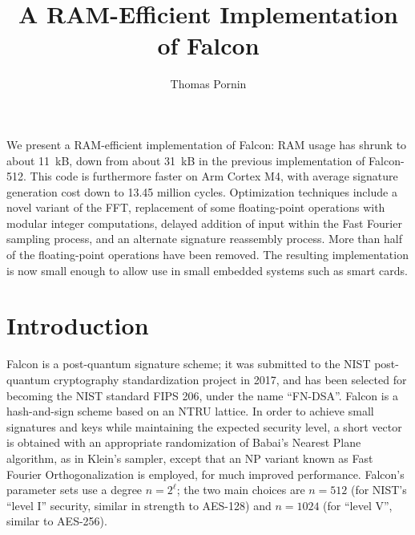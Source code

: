 \documentclass{llncs}
\makeatletter
\renewenvironment{abstract}{%
      \list{}{\advance\topsep by0.35cm\relax\small
      \leftmargin=1cm
      \labelwidth=\z@
      \listparindent=\z@
      \itemindent\listparindent
      \rightmargin\leftmargin}\item[\hskip\labelsep
                                    \textsf{\textbf{\abstractname}}]}
    {\endlist}
\makeatother
\begin{document}
\title{\textsf{A RAM-Efficient Implementation of Falcon}}

\author{Thomas Pornin}

\maketitle
\noindent{}

\begin{abstract}
We present a RAM-efficient implementation of Falcon: RAM usage has
shrunk to about 11~kB, down from about 31~kB in the previous
implementation of Falcon-512. This code is furthermore faster on Arm
Cortex M4, with average signature generation cost down to 13.45 million
cycles. Optimization techniques include a novel variant of the FFT,
replacement of some floating-point operations with modular integer
computations, delayed addition of input within the Fast Fourier sampling
process, and an alternate signature reassembly process. More than half
of the floating-point operations have been removed. The resulting
implementation is now small enough to allow use in small embedded
systems such as smart cards.
\end{abstract}


\section{Introduction}

Falcon is a post-quantum signature scheme\cite{FalconRound3}; it was
submitted to the NIST post-quantum cryptography standardization
project\cite{NISTPQC} in 2017, and has been selected for becoming the
NIST standard FIPS 206, under the name ``FN-DSA''. Falcon is a
hash-and-sign scheme based on an NTRU lattice. In order to achieve small
signatures and keys while maintaining the expected security level, a
short vector is obtained with an appropriate randomization of Babai's
Nearest Plane algorithm\cite{Bab1986}, as in Klein's
sampler\cite{Kle2000}, except that an NP variant known as Fast Fourier
Orthogonalization is employed, for much improved
performance\cite{DucPre2016}. Falcon's parameter sets use a degree $n =
2^\ell$; the two main choices are $n = 512$ (for NIST's ``level I''
security, similar in strength to AES-128) and $n = 1024$ (for ``level
V'', similar to AES-256).
\end{document}
